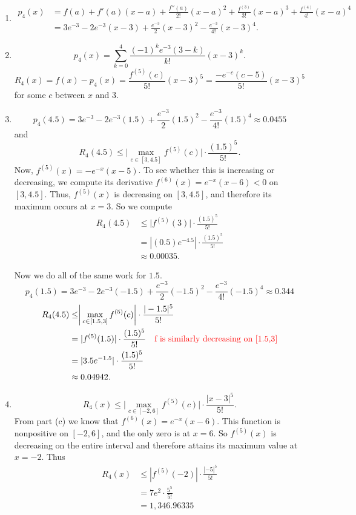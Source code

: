 \documentclass[handout]{ximera}
\begin{document}
\begin{problem}
\begin{freeResponse}
\begin{enumerate}
	\item  
		\begin{align*}
		p_4(x) &= f(a) + f'(a)(x-a) + \frac{f''(a)}{2!}(x-a)^2 + \frac{f^{(3)}}{3!}(x-a)^3 + \frac{f^{(4)}}{4!}(x-a)^4  \\
		&= 3e^{-3} -2e^{-3}(x-3) + \frac{e^{-3}}{2}(x-3)^2 - \frac{e^{-3}}{4!}(x-3)^4.
		\end{align*}
	
	\item  
		\[
		p_4(x) = \sum_{k=0}^4 \frac{(-1)^k e^{-3} (3-k)}{k!}(x-3)^k.
		\]
		\[
		R_4(x) = f(x)-p_4(x) = \frac{f^{(5)}(c)}{5!}(x-3)^5 = \frac{-e^{-c} (c-5)}{5!}(x-3)^5
		\]
	for some $c$ between $x$ and $3$.
	
	\item  
		\[
		p_4(4.5) = 3e^{-3} - 2e^{-3}(1.5) + \frac{e^{-3}}{2}(1.5)^2 - \frac{e^{-3}}{4!}(1.5)^4 \approx 0.0455
		\]
	and
		\[
		R_4(4.5) \leq \biggr| \max_{c \in [3,4.5]} f^{(5)}(c) \biggr| \cdot \frac{(1.5)^5}{5!}.
		\]
	Now, $f^{(5)}(x) = -e^{-x}(x-5)$.  
	To see whether this is increasing or decreasing, we compute its derivative $f^{(6)}(x) = e^{-x}(x-6) < 0$ on $[3,4.5]$.  
	Thus, $f^{(5)}(x)$ is decreasing on $[3,4.5]$, and therefore its maximum occurs at $x=3$.  
	So we compute
		\begin{align*}
		R_4(4.5) &\leq \biggr| f^{(5)}(3) \biggr| \cdot \frac{(1.5)^5}{5!}  \\
		&= |(0.5)e^{-4.5}| \cdot \frac{(1.5)^5}{5!}  \\
		&\approx 0.00035.
		\end{align*}
		
	Now we do all of the same work for $1.5$.  
		\[
		p_4(1.5) = 3e^{-3} - 2e^{-3}(-1.5) + \frac{e^{-3}}{2}(-1.5)^2 - \frac{e^{-3}}{4!}(-1.5)^4 \approx 0.344
		\]
		\begin{align*}
		R_4(4.5) &\leq \biggr| \max_{c \in [1.5,3]} f^{(5)}(c) \biggr| \cdot \frac{|-1.5|^5}{5!} \\
		&= | f^{(5)}(1.5) | \cdot \frac{(1.5)^5}{5!}  \quad {\color{red}\text{f is similarly decreasing on [1.5,3]}}\\
		&= | 3.5 e^{-1.5} |  \cdot \frac{(1.5)^5}{5!}  \\
		&\approx 0.04942.
		\end{align*}
	
	\item  
		\[
		R_4(x) \leq \biggr| \max_{c \in [-2,6]} f^{(5)}(c) \biggr| \cdot \frac{|x-3|^5}{5!}.
		\]
	From part (c) we know that $f^{(6)}(x) = e^{-x}(x-6)$.  
	This function is nonpositive on $[-2,6]$, and the only zero is at $x=6$.  
	So $f^{(5)}(x)$ is decreasing on the entire interval and therefore attains its maximum value at $x=-2$.  
	Thus
		\begin{align*}
		R_4(x) &\leq |f^{(5)}(-2)| \cdot \frac{|-5|^5}{5!}  \\
		&= 7e^2 \cdot \frac{5^5}{5!}  \\
		&= 1,346.96335
		\end{align*}
	

\end{enumerate}
\end{freeResponse}
\end{problem}
\end{document}
